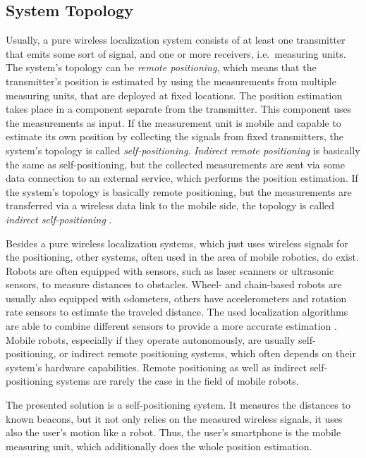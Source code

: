 \subsection{System Topology}
Usually, a pure wireless localization system consists of at least one transmitter that emits some sort of signal, and one or more receivers, i.e.\ measuring units. The system's topology can be \emph{remote positioning}, which means that the transmitter's position is estimated by using the measurements from multiple measuring units, that are deployed at fixed locations. The position estimation takes place in a component separate from the transmitter. This component uses the measurements as input. If the measurement unit is mobile and capable to estimate its own position by collecting the signals from fixed transmitters, the system's topology is called \emph{self-positioning}. \emph{Indirect remote positioning} is basically the same as self-positioning, but the collected measurements are sent via some data connection to an external service, which performs the position estimation. If the system's topology is basically remote positioning, but the measurements are transferred via a wireless data link to the mobile side, the topology is called \emph{indirect self-positioning} \citep{IEEE:survey_wireless_indoor_pos}.

Besides a pure wireless localization systems, which just uses wireless signals for the positioning, other systems, often used in the area of mobile robotics, do exist. Robots are often equipped with sensors, such as laser scanners or ultrasonic sensors, to measure distances to obstacles. Wheel- and chain-based robots are usually also equipped with odometers, others have accelerometers and rotation rate sensors to estimate the traveled distance. The used localization algorithms are able to combine different sensors to provide a more accurate estimation \citep{thrun:prob_robo}. Mobile robots, especially if they operate autonomously, are usually self-positioning, or indirect remote positioning systems, which often depends on their system's hardware capabilities. Remote positioning as well as indirect self-positioning systems are rarely the case in the field of mobile robots.

The presented solution is a self-positioning system. It measures the distances to known beacons, but it not only relies on the measured wireless signals, it uses also the user's motion like a robot. Thus, the user's smartphone is the mobile measuring unit, which additionally does the whole position estimation.

